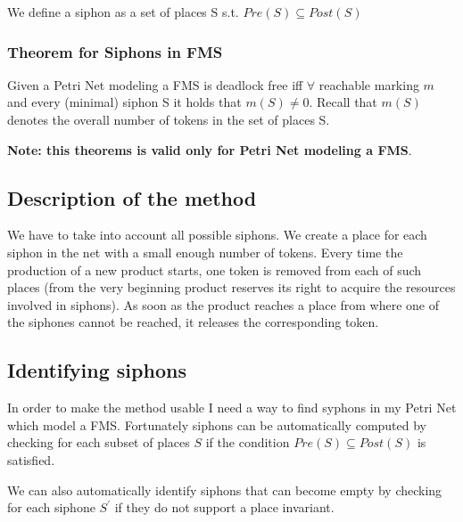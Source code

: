 We define a siphon as a set of places S s.t. $Pre(S) \subseteq Post(S)$

\subsubsection{Theorem for Siphons in FMS}
Given a Petri Net modeling a FMS is deadlock free iff $\forall$ reachable marking $m$ and every (minimal) siphon S it holds that $m(S) \neq 0$. Recall that $m(S)$ denotes the overall number of tokens in the set of places S.\par
\textbf{Note: this theorems is valid only for Petri Net modeling a FMS}.

\subsection{Description of the method}
We have to take into account all possible siphons. We create a place for each siphon in the net with a small enough number of tokens. Every time the production of a new product starts, one token is removed from each of such places (from the very beginning product reserves its right to acquire the resources involved in siphons). As soon as the product reaches a place from where one of the siphones cannot be reached, it releases the corresponding token.

\subsection{Identifying siphons}
In order to make the method usable I need a way to find syphons in my Petri Net which model a FMS. Fortunately siphons can be automatically computed by checking for each subset of places $S$ if the condition $Pre(S) \subseteq Post(S)$ is satisfied.\par
We can also automatically identify siphons that can become empty by checking for each siphone $S^{'}$ if they do not support a place invariant.